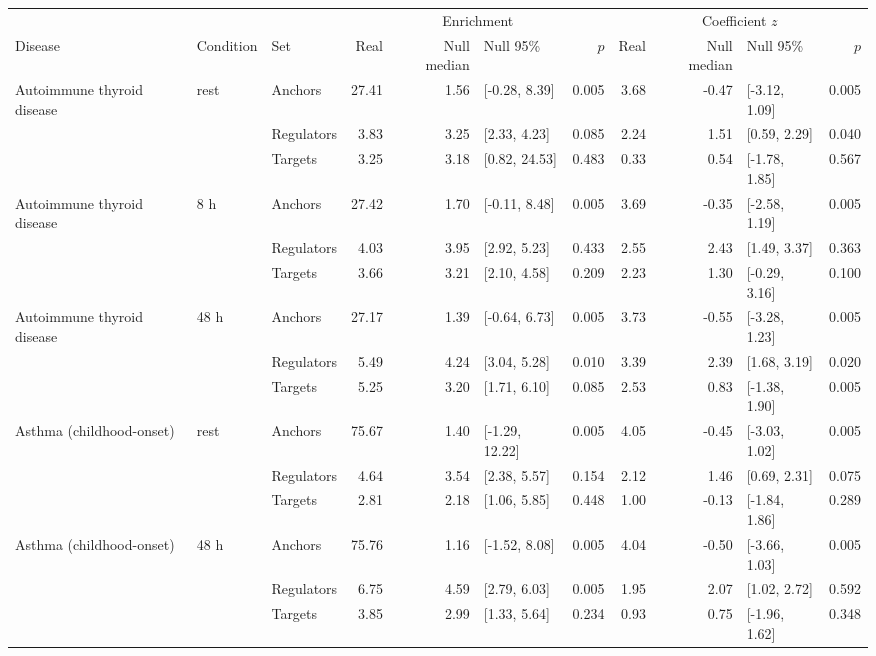 \begin{tabular}{lllrrlrrrlr}
\toprule
 & & & \multicolumn{4}{c}{Enrichment} & \multicolumn{4}{c}{Coefficient $z$} \\
\cmidrule(lr){4-7}\cmidrule(lr){8-11}
Disease & Condition & Set & Real & Null median & Null 95\% & $p$ & Real & Null median & Null 95\% & $p$ \\
\midrule
Autoimmune thyroid disease & rest & Anchors & 27.41 & 1.56 & [-0.28, 8.39] & 0.005 & 3.68 & -0.47 & [-3.12, 1.09] & 0.005 \\
 &  & Regulators & 3.83 & 3.25 & [2.33, 4.23] & 0.085 & 2.24 & 1.51 & [0.59, 2.29] & 0.040 \\
 &  & Targets & 3.25 & 3.18 & [0.82, 24.53] & 0.483 & 0.33 & 0.54 & [-1.78, 1.85] & 0.567 \\
\addlinespace
Autoimmune thyroid disease & 8 h & Anchors & 27.42 & 1.70 & [-0.11, 8.48] & 0.005 & 3.69 & -0.35 & [-2.58, 1.19] & 0.005 \\
 &  & Regulators & 4.03 & 3.95 & [2.92, 5.23] & 0.433 & 2.55 & 2.43 & [1.49, 3.37] & 0.363 \\
 &  & Targets & 3.66 & 3.21 & [2.10, 4.58] & 0.209 & 2.23 & 1.30 & [-0.29, 3.16] & 0.100 \\
\addlinespace
Autoimmune thyroid disease & 48 h & Anchors & 27.17 & 1.39 & [-0.64, 6.73] & 0.005 & 3.73 & -0.55 & [-3.28, 1.23] & 0.005 \\
 &  & Regulators & 5.49 & 4.24 & [3.04, 5.28] & 0.010 & 3.39 & 2.39 & [1.68, 3.19] & 0.020 \\
 &  & Targets & 5.25 & 3.20 & [1.71, 6.10] & 0.085 & 2.53 & 0.83 & [-1.38, 1.90] & 0.005 \\
\addlinespace
Asthma (childhood-onset) & rest & Anchors & 75.67 & 1.40 & [-1.29, 12.22] & 0.005 & 4.05 & -0.45 & [-3.03, 1.02] & 0.005 \\
 &  & Regulators & 4.64 & 3.54 & [2.38, 5.57] & 0.154 & 2.12 & 1.46 & [0.69, 2.31] & 0.075 \\
 &  & Targets & 2.81 & 2.18 & [1.06, 5.85] & 0.448 & 1.00 & -0.13 & [-1.84, 1.86] & 0.289 \\
\addlinespace
Asthma (childhood-onset) & 48 h & Anchors & 75.76 & 1.16 & [-1.52, 8.08] & 0.005 & 4.04 & -0.50 & [-3.66, 1.03] & 0.005 \\
 &  & Regulators & 6.75 & 4.59 & [2.79, 6.03] & 0.005 & 1.95 & 2.07 & [1.02, 2.72] & 0.592 \\
 &  & Targets & 3.85 & 2.99 & [1.33, 5.64] & 0.234 & 0.93 & 0.75 & [-1.96, 1.62] & 0.348 \\
\bottomrule
\end{tabular}
